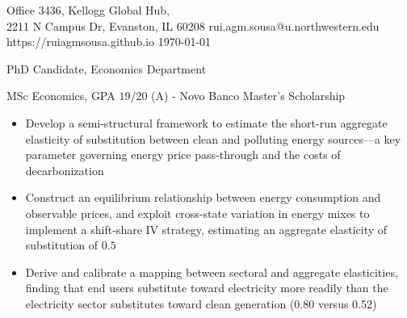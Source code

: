 \documentclass{practical-resume}
\begin{document}
\namehead

\begin{address}{
	Office 3436, Kellogg Global Hub, \\
	2211 N Campus Dr, Evanston, IL 60208
}
{rui.agm.sousa@u.northwestern.edu}
{https://ruiagmsousa.github.io}
{\today}
\end{address}

\begin{position}{PhD Candidate, }{Economics Department}
\end{position} 
\vspace{1em}

	\begin{position}{MSc Economics, }{GPA $19/20$ (A) - Novo Banco Master's Scholarship}
	\end{position}
\vspace{0.6em}


\begin{itemize}[leftmargin=2.5em, itemsep=-0.25em, topsep=0.5em]\vspace{-0.3em}
    \item Develop a semi-structural framework to estimate the short-run aggregate elasticity of substitution between clean and polluting energy sources---a key parameter governing energy price pass-through and the costs of decarbonization
    \item Construct an equilibrium relationship between energy consumption and observable prices, and exploit cross-state variation in energy mixes to implement a shift-share IV strategy, estimating an aggregate elasticity of substitution of $0.5$
    \item Derive and calibrate a mapping between sectoral and aggregate elasticities, finding that end users substitute toward electricity more readily than the electricity sector substitutes toward clean generation ($0.80$ versus $0.52$)
\end{itemize}
\end{document}
